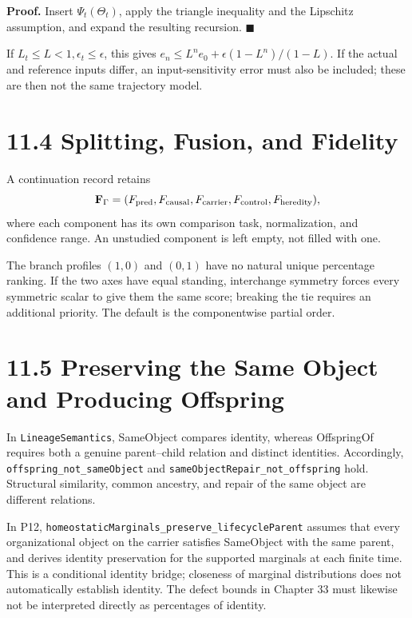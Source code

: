 \documentclass[
  english,
  11pt,
  oneside]{book}
\begin{document}
\textbf{Proof.} Insert \(\Psi_t(\Theta_t)\), apply the triangle inequality and the Lipschitz assumption, and expand the resulting recursion. \(\blacksquare\)

If \(L_t\le L<1,\epsilon_t\le\epsilon\), this gives \(e_n\le L^ne_0+\epsilon(1-L^n)/(1-L)\). If the actual and reference inputs differ, an input-sensitivity error must also be included; these are then not the same trajectory model.

\section{11.4 Splitting, Fusion, and Fidelity}\label{splitting-fusion-and-fidelity}

A continuation record retains \[\mathbf F_\Gamma=
(F_{\rm pred},F_{\rm causal},F_{\rm carrier},
F_{\rm control},F_{\rm heredity}),\] where each component has its own comparison task, normalization, and confidence range. An unstudied component is left empty, not filled with one.

The branch profiles \((1,0)\) and \((0,1)\) have no natural unique percentage ranking. If the two axes have equal standing, interchange symmetry forces every symmetric scalar to give them the same score; breaking the tie requires an additional priority. The default is the componentwise partial order.

\section{11.5 Preserving the Same Object and Producing Offspring}\label{preserving-the-same-object-and-producing-offspring}

In \nolinkurl{LineageSemantics}, SameObject compares identity, whereas OffspringOf requires both a genuine parent--child relation and distinct identities. Accordingly, \nolinkurl{offspring_not_sameObject} and \nolinkurl{sameObjectRepair_not_offspring} hold. Structural similarity, common ancestry, and repair of the same object are different relations.

In P12, \nolinkurl{homeostaticMarginals_preserve_lifecycleParent} assumes that every organizational object on the carrier satisfies SameObject with the same parent, and derives identity preservation for the supported marginals at each finite time. This is a conditional identity bridge; closeness of marginal distributions does not automatically establish identity. The defect bounds in Chapter 33 must likewise not be interpreted directly as percentages of identity.
\end{document}
